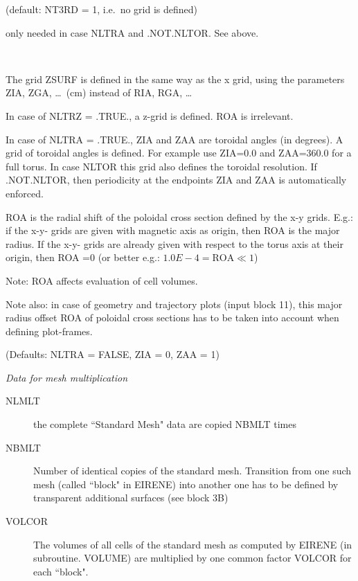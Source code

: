 \begin{description}
        (default: NT3RD = 1, i.e.\ no grid is defined)
  \item[NTTRA] only needed in case
        NLTRA and .NOT.NLTOR.
        See above.
  \item[ZIA,ZGA,ZAA,ZZA,ROA] ~ 

        The  grid ZSURF is defined in the same way as the x grid, using
        the parameters ZIA, ZGA, \dots\ (\si{\centi\metre}) instead of RIA, RGA, \dots

        In case of NLTRZ = .TRUE., a z-grid is defined.
        ROA is irrelevant.

        In case of NLTRA = .TRUE., ZIA and ZAA are toroidal angles (in degrees).
        A grid of toroidal angles is defined.
        For example use ZIA=0.0 and ZAA=360.0 for a full torus.
        In case NLTOR this grid also defines the toroidal resolution.
        If .NOT.NLTOR, then periodicity at the endpoints ZIA and ZAA is automatically
        enforced.

        ROA is the radial shift of the poloidal cross section defined by the x-y grids.
        E.g.: if the x-y- grids are given with magnetic axis as origin, then ROA is the
        major radius.
        If the x-y- grids are already given with respect to the torus axis at their
        origin, then ROA =0 (or better e.g.: $1.0E-4 = \mbox{ROA} \ll 1$)

        Note: ROA affects evaluation of cell volumes.

        Note also: in case of geometry and trajectory plots (input block 11), this
        major radius offset ROA of poloidal cross sections has to be taken into account
        when defining plot-frames.

        (Defaults: NLTRA = FALSE, ZIA = 0, ZAA = 1) 

\end{description}
\textsl{Data for mesh multiplication}
\begin{description}
  \item[NLMLT] the complete ``Standard Mesh" data are copied NBMLT times
  \item[NBMLT] Number of identical copies of the standard mesh.
        Transition from one such mesh (called ``block" in EIRENE) into another one has
        to be defined by transparent additional surfaces (see block 3B)
  \item[VOLCOR]
        The volumes of all cells of the standard mesh as computed by EIRENE (in
        subroutine.
        VOLUME) are multiplied by one common factor VOLCOR for each ``block".
\end{description}
